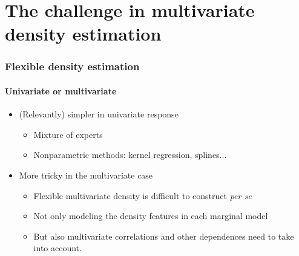 \documentclass{beamer}
\begin{document}
\section{The challenge in multivariate density estimation}
\begin{frame}
  \frametitle{Flexible density estimation}
  \framesubtitle{Univariate or multivariate}
\begin{itemize}
\item (Relevantly) simpler in univariate response
  \begin{itemize}
  \item  Mixture of experts
  \item  Nonparametric methods: kernel regression, splines...
  \end{itemize}

\item More tricky in the multivariate case

  \begin{itemize}
  \item Flexible multivariate density is difficult to construct \emph{per se}
  \item Not only modeling the density features in each marginal model
  \item But also multivariate correlations and other dependences need to take into account.
  \end{itemize}
\end{itemize}
\end{frame}
\end{document}
